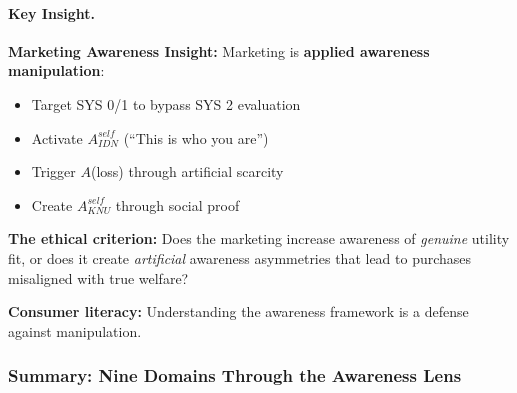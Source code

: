 \paragraph{Key Insight.}
\begin{tcolorbox}[colback=yellow!10!white, colframe=yellow!50!black]
\textbf{Marketing Awareness Insight:}
Marketing is \textbf{applied awareness manipulation}:
\begin{itemize}
\item Target SYS 0/1 to bypass SYS 2 evaluation
\item Activate $A^{self}_{IDN}$ (``This is who you are'')
\item Trigger $A$(loss) through artificial scarcity
\item Create $A^{self}_{KNU}$ through social proof
\end{itemize}

\textbf{The ethical criterion:}
Does the marketing increase awareness of \emph{genuine} utility fit,
or does it create \emph{artificial} awareness asymmetries that lead
to purchases misaligned with true welfare?

\textbf{Consumer literacy:}
Understanding the awareness framework is a defense against manipulation.
\end{tcolorbox}

\subsubsection{Summary: Nine Domains Through the Awareness Lens}

